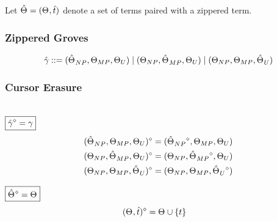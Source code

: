 Let $\Z{\Set} = (\Set, \Z{t})$ denote a set of terms paired with a zippered term.


\subsubsection{Zippered Groves}

\begin{gather*}
  \arraycolsep=0pt
  \begin{array}{lll}
    \Z{\gamma} & {}::={} &
      (\Z{\Set}_{NP}, \Set[MP], \Set[U])
      \mid (\Set[NP], \Z{\Set}_{MP}, \Set[U])
      \mid (\Set[NP], \Set[MP], \Z{\Set}_U)
  \end{array}
\end{gather*}


\subsubsection{Cursor Erasure}\hspace*{\fill} \\

\noindent $\boxed{\erase{\Z{\gamma}} = \gamma}$
%
\begin{align*}
  \erase{(\Z{\Set}_{NP}, \Set[MP], \Set[U])} &= (\erase{\Z{\Set}_{NP}}, \Set[MP], \Set[U]) \\
  \erase{(\Set[NP], \Z{\Set}_{MP}, \Set[U])} &= (\Set[NP], \erase{\Z{\Set}_{MP}}, \Set[U]) \\
  \erase{(\Set[NP], \Set[MP], \Z{\Set}_U)} &= (\Set[NP], \Set[MP], \erase{\Z{\Set}_U})
\end{align*}

\noindent $\boxed{\erase{\Z{\Set}} = \Set}$
%
\begin{align*}
  \erase{(\Set, \Z{t})} &= \Set \cup \SetOf{t}
\end{align*}

